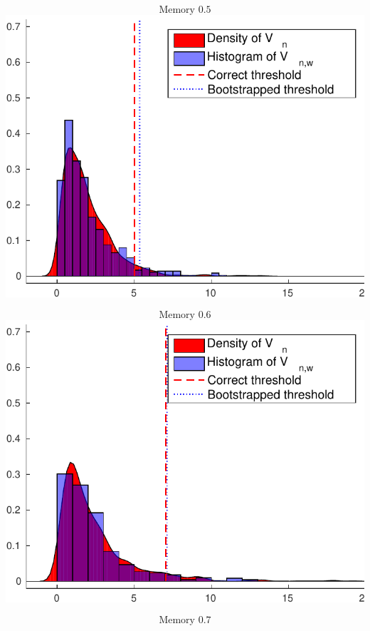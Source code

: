 \documentclass[landscape,a0]{a0poster_csml_v2}
\begin{document}
\begin{poster}
\begin{PosterColumn}
\begin{minipage}[c]{0.24\textwidth} $$\text{Memory } 0.5$$
\includegraphics[width=\textwidth]{../img/wild_ecdf5.pdf} 
\end{minipage}
\begin{minipage}[c]{0.24\textwidth} $$\text{Memory } 0.6$$
\includegraphics[width=\textwidth]{../img/wild_ecdf6.pdf} 
\end{minipage}
\begin{minipage}[c]{0.24\textwidth} $$\text{Memory } 0.7$$

\end{minipage}
\end{PosterColumn}
\end{poster}
\end{document}
